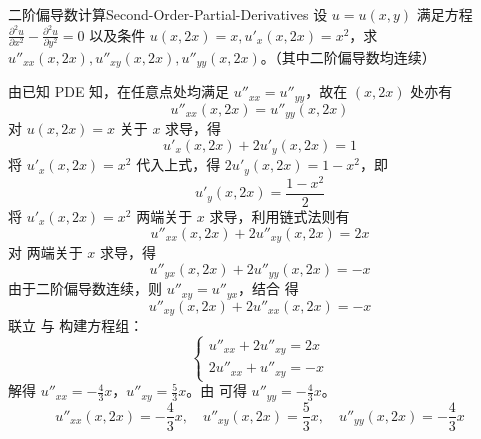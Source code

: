\begin{problem}{二阶偏导数计算}{Second-Order-Partial-Derivatives}
    设 $u = u(x, y)$ 满足方程 $\frac{\partial^2 u}{\partial x^2} - \frac{\partial^2 u}{\partial y^2} = 0$ 以及条件 $u(x, 2x) = x, u'_x(x, 2x) = x^2$，求 $u''_{xx}(x, 2x), u''_{xy}(x, 2x), u''_{yy}(x, 2x)$。（其中二阶偏导数均连续）
\end{problem}

\begin{solution}
    由已知 PDE 知，在任意点处均满足 $u''_{xx} = u''_{yy}$，故在 $(x, 2x)$ 处亦有
    \begin{equation}\label{eq:pde-1}
        u''_{xx}(x, 2x) = u''_{yy}(x, 2x)
    \end{equation}
    对 $u(x, 2x) = x$ 关于 $x$ 求导，得
    \begin{equation}
        u'_x(x, 2x) + 2u'_y(x, 2x) = 1
    \end{equation}
    将 $u'_x(x, 2x) = x^2$ 代入上式，得 $2u'_y(x, 2x) = 1 - x^2$，即
    \begin{equation}\label{eq:uy-val}
        u'_y(x, 2x) = \frac{1 - x^2}{2}
    \end{equation}
    将 $u'_x(x, 2x) = x^2$ 两端关于 $x$ 求导，利用链式法则有
    \begin{equation}\label{eq:uxx-1}
        u''_{xx}(x, 2x) + 2u''_{xy}(x, 2x) = 2x
    \end{equation}
    对  两端关于 $x$ 求导，得
    \begin{equation}
        u''_{yx}(x, 2x) + 2u''_{yy}(x, 2x) = -x
    \end{equation}
    由于二阶偏导数连续，则 $u''_{xy} = u''_{yx}$，结合  得
    \begin{equation}\label{eq:uxx-2}
        u''_{xy}(x, 2x) + 2u''_{xx}(x, 2x) = -x
    \end{equation}
    联立  与  构建方程组：
    \begin{equation}
        \begin{cases}
            u''_{xx} + 2u''_{xy} = 2x \\
            2u''_{xx} + u''_{xy} = -x
        \end{cases}
    \end{equation}
    解得 $u''_{xx} = -\frac{4}{3}x$，$u''_{xy} = \frac{5}{3}x$。由  可得 $u''_{yy} = -\frac{4}{3}x$。
    \begin{equation}
        \boxed{u''_{xx}(x, 2x) = -\frac{4}{3}x, \quad u''_{xy}(x, 2x) = \frac{5}{3}x, \quad u''_{yy}(x, 2x) = -\frac{4}{3}x}
    \end{equation}
\end{solution}


